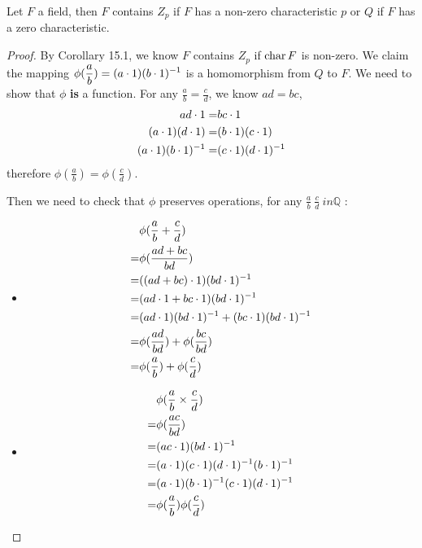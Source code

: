 \documentclass[../main.tex]{subfiles}
\begin{document}
\begin{corollary}
  Let $F$ a field, then $F$ contains $Z_p$
  if $F$ has a non-zero characteristic $p$
  or $Q$ if $F$ has a zero characteristic.
\end{corollary}
\begin{proof}
  By Corollary 15.1, we know $F$ contains $Z_p$ if $\operatorname{char} F$ is non-zero.
  We claim the mapping 
  $\displaystyle \phi(\frac{a}{b}) = (a \cdot 1)(b \cdot 1)^{-1}$ 
  is a homomorphism from $Q$ to $F$. We need to show that $\phi$ \textbf{is} a function.
  For any $\displaystyle \frac{a}{b} = \frac{c}{d}$,
  we know $ad = bc$, 
  \begin{align*}
    ad \cdot 1 =& bc \cdot 1 \\
    (a \cdot 1)(d \cdot 1) =& (b \cdot 1) (c \cdot 1) \\
    (a \cdot 1)(b \cdot 1)^{-1} =& (c \cdot 1) (d \cdot 1)^{-1}
  \end{align*}
  therefore $\displaystyle \phi(\frac{a}{b}) = \phi(\frac{c}{d})$.

  Then we need to check that $\phi$ preserves operations, 
  for any $\displaystyle \frac{a}{b} \ \frac{c}{d} \ in \mathbb{Q}$ :
  \begin{itemize}
    \item 
      \begin{align*}
         & \phi(\frac{a}{b} + \frac{c}{d}) \\
        =& \phi(\frac{ad + bc}{bd}) \\
        =& ((ad + bc) \cdot 1) (bd \cdot 1)^{-1} \\
        =& (ad \cdot 1 + bc \cdot 1) (bd \cdot 1)^{-1}  \\
        =& (ad \cdot 1)(bd \cdot 1)^{-1} + (bc \cdot 1) (bd \cdot 1)^{-1} \\
        =& \phi(\frac{ad}{bd}) + \phi(\frac{bc}{bd}) \\
        =& \phi(\frac{a}{b}) + \phi(\frac{c}{d})
      \end{align*}
    \item 
      \begin{align*}
         & \phi(\frac{a}{b} \times \frac{c}{d}) \\
        =& \phi(\frac{ac}{bd}) \\
        =& (ac \cdot 1)(bd \cdot 1)^{-1} \\
        =& (a \cdot 1)(c \cdot 1)(d \cdot 1)^{-1}(b \cdot 1)^{-1} \\
        =& (a \cdot 1)(b \cdot 1)^{-1}(c \cdot 1)(d \cdot 1)^{-1} \\
        =& \phi(\frac{a}{b}) \phi(\frac{c}{d})
      \end{align*}
  \end{itemize}
 

\end{proof}
\end{document}
